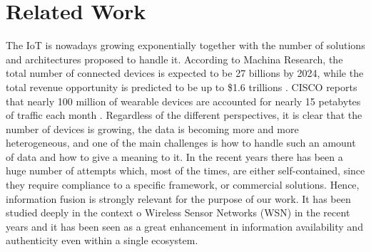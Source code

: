 \section{Related Work}
\label{sec:rel}

The IoT is nowadays growing exponentially together with the number of solutions and architectures proposed to handle it.
According to Machina Research, the total number of connected devices is expected to be 27 billions by 2024, while the total revenue opportunity is predicted to be up to \$1.6 trillions \cite{machina}. CISCO reports that nearly 100 million of wearable devices are accounted for nearly 15 petabytes of traffic each month \cite{CISCO2015}.
Regardless of the different perspectives, it is clear that the number of devices is growing, the data is becoming more and more heterogeneous, and one of the main challenges is how to handle such an amount of data and how to give a meaning to it.
In the recent years there has been a huge number of attempts which, most of the times, are either self-contained, since they require compliance to a specific framework, or commercial solutions.
Hence, information fusion is strongly relevant for the purpose of our work.
It has been studied deeply in the context o Wireless Sensor Networks (WSN) in the recent years and it has been seen as a great enhancement in information availability and authenticity \cite{Khaleghi2013} even within a single ecosystem. 

